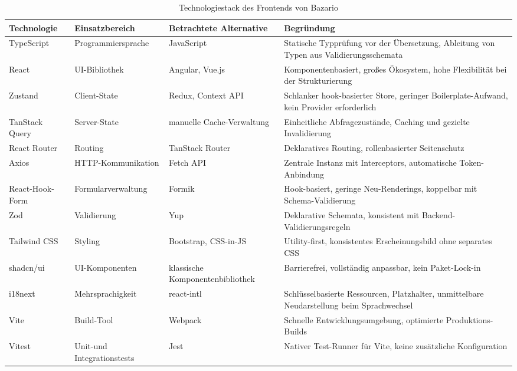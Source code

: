 \begin{table}[htbp]
\centering
\caption{Technologiestack des Frontends von Bazario}
\label{tab:technologiestack}
\small
\begin{tabular}{|p{2.3cm}|p{2.4cm}|p{2.6cm}|p{4.6cm}|}
\hline
\textbf{Technologie} & \textbf{Einsatzbereich} &
\textbf{Betrachtete Alternative} & \textbf{Begründung} \\
\hline
TypeScript & Programmier\-sprache & JavaScript &
Statische Typprüfung vor der Übersetzung, Ableitung von Typen aus
Validierungsschemata \\
\hline
React & \acs{UI}-Bibliothek & Angular, Vue.js &
Komponentenbasiert, großes Ökosystem, hohe Flexibilität bei der
Strukturierung \\
\hline
Zustand & Client-State & Redux, Context \acs{API} &
Schlanker hook-basierter Store, geringer Boilerplate-Aufwand, kein Provider erforderlich \\
\hline
TanStack Query & Server-State & manuelle Cache-Verwaltung &
Einheitliche Abfragezustände, Caching und gezielte
Invalidierung \\
\hline
React Router & Routing & TanStack Router &
Deklaratives Routing, rollenbasierter Seitenschutz \\
\hline
Axios & \acs{HTTP}-Kom\-mu\-ni\-ka\-tion & Fetch \acs{API} &
Zentrale Instanz mit Interceptors, automatische
Token-Anbindung \\
\hline
React-Hook-Form & Formular\-verwaltung & Formik &
Hook-basiert, geringe Neu-Renderings, koppelbar mit
Schema-Validierung \\
\hline
Zod & Validierung & Yup &
Deklarative Schemata, konsistent mit Backend-Validierungsregeln \\
\hline
Tailwind CSS & Styling & Bootstrap, CSS-in-JS &
Utility-first, konsistentes Erscheinungsbild ohne separates
\acs{CSS} \\
\hline
shadcn/ui & \acs{UI}-Kom\-po\-nen\-ten & klassische
Komponenten\-bibliothek &
Barrierefrei, vollständig anpassbar, kein Paket-Lock-in \\
\hline
i18next & Mehr\-sprachig\-keit & react-intl &
Schlüsselbasierte Ressourcen, Platzhalter, unmittelbare
Neudarstellung beim Sprachwechsel \cite{i18next_docs} \\
\hline
Vite & Build-Tool & Webpack &
Schnelle Entwicklungsumgebung, optimierte
Produktions-Builds \cite{vite_docs} \\
\hline
Vitest & Unit-und Integra\-tions\-tests & Jest &
Nativer Test-Runner für Vite, keine zusätzliche Konfiguration

\end{tabular}
\end{table}
